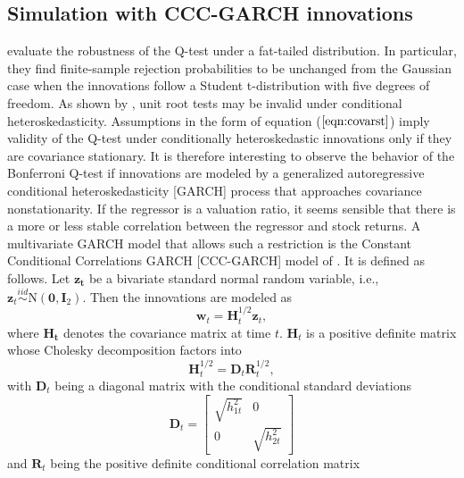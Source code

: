 \documentclass[11pt, a4paper]{article}
\begin{document}
\subsection{Simulation with CCC-GARCH innovations}
\label{Simulation with CCC-GARCH innovations}
\citet{campbell2006efficient} evaluate the robustness of the Q-test under a fat-tailed distribution. In particular, they find finite-sample rejection probabilities to be unchanged from the Gaussian case when the innovations follow a Student t-distribution with five degrees of freedom. As shown by \citet{cavaliere2005unit}, unit root tests may be invalid under conditional heteroskedasticity. Assumptions in the form of equation ($\ref{eqn:covarst}$) imply validity of the Q-test under conditionally heteroskedastic innovations only if they are covariance stationary. 
It is therefore interesting to observe the behavior of the Bonferroni Q-test if innovations are modeled by a generalized autoregressive conditional heteroskedasticity [GARCH] process that approaches covariance nonstationarity. If the regressor is a valuation ratio, it seems sensible that there is a more or less stable correlation between the regressor and stock returns. A multivariate GARCH model that allows such a restriction is the Constant Conditional Correlations GARCH  [CCC-GARCH] model of \citet{bollerslev1990modelling}. It is defined as follows. Let $ \boldsymbol{z_{t}}$ be a bivariate standard normal random variable, i.e., $ \boldsymbol{z}_{t} \stackrel{i i d}{\sim} \mathrm{N}\left(\mathbf{0}, \boldsymbol{I}_{2}\right)$. Then the innovations are modeled as 
\begin{equation}
 \boldsymbol{w}_{t}=\boldsymbol{H}_{t}^{1 / 2} \boldsymbol{z}_{t},
\end{equation}
where $ \boldsymbol{H_t}$ denotes the covariance matrix at time $t$. $\boldsymbol{H}_{t}$ is a positive definite matrix whose Cholesky decomposition factors into 
\begin{equation}
\boldsymbol{H}_{t}^{1/2} = \boldsymbol{D}_{t} \boldsymbol{R}_{t}^{1 / 2},
\end{equation}
with $\boldsymbol{D}_{t}$ being a diagonal matrix with the conditional standard deviations 
\begin{equation}
\label{eqn:40}
\boldsymbol{D}_{t}=\left[\begin{array}{cc}{\sqrt{h_{1 t}^{2}}} & {0} \\ {0} & {\sqrt{h_{2 t}^{2}}}\end{array}\right]
\end{equation}
and $\boldsymbol{R}_{t}$ being the positive definite conditional correlation matrix 
\end{document}
